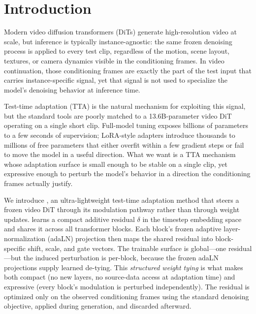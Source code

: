 \section{Introduction}
\label{sec:intro}

Modern video diffusion transformers (DiTs) generate high-resolution video at
scale, but inference is typically instance-agnostic: the same frozen denoising
process is applied to every test clip, regardless of the motion, scene
layout, textures, or camera dynamics visible in the conditioning frames. In
video continuation, those conditioning frames are exactly the part of the
test input that carries instance-specific signal, yet that signal is not used
to specialize the model's denoising behavior at inference time.

Test-time adaptation (TTA) is the natural mechanism for exploiting this
signal, but the standard tools are poorly matched to a 13.6B-parameter video
DiT operating on a single short clip. Full-model tuning exposes billions of
parameters to a few seconds of supervision; LoRA-style adapters introduce
thousands to millions of free parameters that either overfit within a few
gradient steps or fail to move the model in a useful direction. What we want
is a TTA mechanism whose adaptation surface is small enough to be stable on a
single clip, yet expressive enough to perturb the model's behavior in a
direction the conditioning frames actually justify.

We introduce \method, an ultra-lightweight test-time adaptation method that
steers a frozen video DiT through its modulation pathway rather than through
weight updates. \method learns a compact additive residual $\delta$ in the
timestep embedding space and shares it across all transformer blocks. Each
block's frozen adaptive layer-normalization (adaLN) projection then maps the
shared residual into block-specific shift, scale, and gate vectors. The
trainable surface is global---one residual---but the induced perturbation is
per-block, because the frozen adaLN projections supply learned de-tying. This
\emph{structured weight tying} is what makes \method both compact (no new
layers, no source-data access at adaptation time) and expressive (every
block's modulation is perturbed independently). The residual is optimized
only on the observed conditioning frames using the standard denoising
objective, applied during generation, and discarded afterward.

